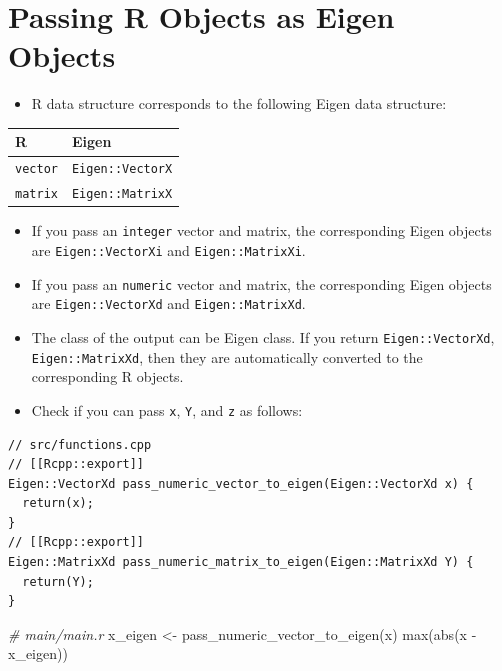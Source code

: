\documentclass[
]{book}
\newenvironment{Shaded}{\begin{snugshade}}{\end{snugshade}}
\newcommand{\CommentTok}[1]{\textcolor[rgb]{0.56,0.35,0.01}{\textit{#1}}}
\newcommand{\FunctionTok}[1]{\textcolor[rgb]{0.00,0.00,0.00}{#1}}
\newcommand{\NormalTok}[1]{#1}
\newcommand{\OtherTok}[1]{\textcolor[rgb]{0.56,0.35,0.01}{#1}}
\newcommand{\SpecialCharTok}[1]{\textcolor[rgb]{0.00,0.00,0.00}{#1}}
\providecommand{\tightlist}{%
  \setlength{\itemsep}{0pt}\setlength{\parskip}{0pt}}
\begin{document}
\hypertarget{passing-r-objects-as-eigen-objects}{%
\section{Passing R Objects as Eigen Objects}\label{passing-r-objects-as-eigen-objects}}

\begin{itemize}
\tightlist
\item
  R data structure corresponds to the following Eigen data structure:
\end{itemize}

\begin{longtable}[]{@{}ll@{}}
\toprule()
R & Eigen \\
\midrule()
\endhead
\texttt{vector} & \texttt{Eigen::VectorX} \\
\texttt{matrix} & \texttt{Eigen::MatrixX} \\
\bottomrule()
\end{longtable}

\begin{itemize}
\tightlist
\item
  If you pass an \texttt{integer} vector and matrix, the corresponding Eigen objects are \texttt{Eigen::VectorXi} and \texttt{Eigen::MatrixXi}.
\item
  If you pass an \texttt{numeric} vector and matrix, the corresponding Eigen objects are \texttt{Eigen::VectorXd} and \texttt{Eigen::MatrixXd}.
\item
  The class of the output can be Eigen class. If you return \texttt{Eigen::VectorXd}, \texttt{Eigen::MatrixXd}, then they are automatically converted to the corresponding R objects.
\item
  Check if you can pass \texttt{x}, \texttt{Y}, and \texttt{z} as follows:
\end{itemize}

\begin{verbatim}
// src/functions.cpp
// [[Rcpp::export]]
Eigen::VectorXd pass_numeric_vector_to_eigen(Eigen::VectorXd x) {
  return(x);
}
// [[Rcpp::export]]
Eigen::MatrixXd pass_numeric_matrix_to_eigen(Eigen::MatrixXd Y) {
  return(Y);
}
\end{verbatim}

\begin{Shaded}
\begin{Highlighting}[]
\CommentTok{\# main/main.r}
\NormalTok{x\_eigen }\OtherTok{\textless{}{-}} \FunctionTok{pass\_numeric\_vector\_to\_eigen}\NormalTok{(x)}
\FunctionTok{max}\NormalTok{(}\FunctionTok{abs}\NormalTok{(x }\SpecialCharTok{{-}}\NormalTok{ x\_eigen))}
\end{Highlighting}
\end{Shaded}
\end{document}
